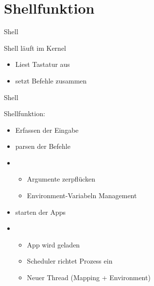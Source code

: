 \section{Shellfunktion}


\begin{frame}{Shell}
    \begin{Large}
        Shell läuft im Kernel
    \end{Large}
    \vspace{15pt}

    \begin{itemize}
        \item Liest Tastatur aus
        \item setzt Befehle zusammen
    \end{itemize}
    
\end{frame}


\begin{frame}{Shell}
    \begin{Large}
        Shellfunktion: 
    \end{Large}
    \vspace{15pt} 
    
    \begin{itemize}
        \item Erfassen der Eingabe
        \item parsen der Befehle
        \item [] \begin{itemize}
            \item Argumente zerpflücken
            \item Environment-Variabeln Management
        \end{itemize}
        \item starten der Apps
        \item [] \begin{itemize}
            \item App wird geladen
            \item Scheduler richtet Prozess ein
            \item Neuer Thread (Mapping + Environment)
        \end{itemize}
    \end{itemize}
\end{frame}

